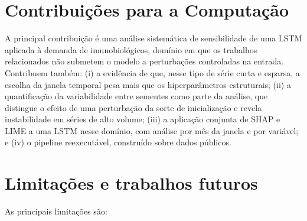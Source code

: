 \documentclass[
    12pt,
    openright,
    oneside,
    a4paper,
    english,
    brazil
]{abntex2}
\begin{document}
\section{Contribuições para a Computação}

A principal contribuição é uma análise sistemática de sensibilidade de uma LSTM aplicada à demanda de imunobiológicos, domínio em que os trabalhos relacionados não submetem o modelo a perturbações controladas na entrada. Contribuem também: (i) a evidência de que, nesse tipo de série curta e esparsa, a escolha da janela temporal pesa mais que os hiperparâmetros estruturais; (ii) a quantificação da variabilidade entre sementes como parte da análise, que distingue o efeito de uma perturbação da sorte de inicialização e revela instabilidade em séries de alto volume; (iii) a aplicação conjunta de SHAP e LIME a uma LSTM nesse domínio, com análise por mês da janela e por variável; e (iv) o pipeline reexecutável, construído sobre dados públicos.

\section{Limitações e trabalhos futuros}
\label{sec:limitacoes}

As principais limitações são:
\end{document}

